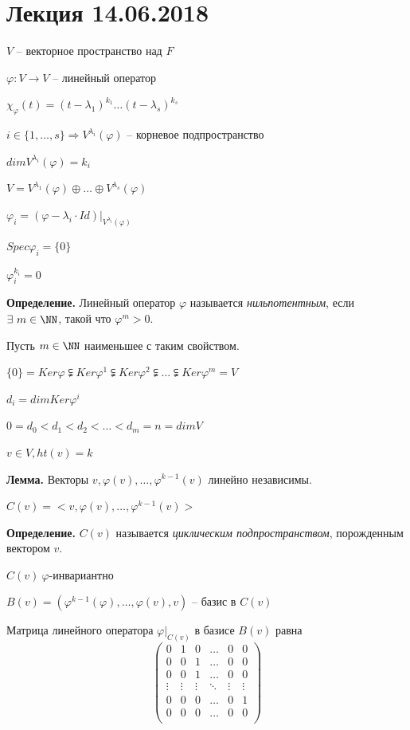 \section{Лекция 14.06.2018}

$V$ -- векторное пространство над $F$

$\varphi: V \rightarrow V$ -- линейный оператор

$\chi_{\varphi} (t) = (t - \lambda_1)^{k_1} \dots (t - \lambda_s)^{k_s}$

$i \in \{1, \dots, s\} \Rightarrow V^{\lambda_i} (\varphi)$ -- корневое подпространство

$dim V^{\lambda_i} (\varphi) = k_i$

$V = V^{\lambda_1} (\varphi) \oplus \dots \oplus V^{\lambda_s} (\varphi)$

$\varphi_i = (\varphi - \lambda_i \cdot Id) | _{V^{\lambda_i} (\varphi)}$

$Spec \varphi_i = \{0\}$

$\varphi_i^{k_i} = 0$

\bigskip
\textbf{Определение.} Линейный оператор $\varphi$ называется \textit{нильпотентным}, если $\exists \ m \in \NN$, такой что $\varphi^m > 0$.

\bigskip
Пусть $m \in \NN$ наименьшее с таким свойством.

$\{0\} = Ker \varphi \subsetneqq Ker \varphi^1 \subsetneqq Ker \varphi^2 \subsetneqq \dots \subsetneqq Ker \varphi^m = V$

$d_i = dim Ker \varphi^i$

$0 = d_0 < d_1 < d_2 < \dots < d_m = n = dim V$

$v \in V, ht(v) = k$

\bigskip
\textbf{Лемма.} Векторы $v, \varphi(v), \dots, \varphi^{k-1}(v)$ линейно независимы.

\bigskip
$C(v) = <v, \varphi(v), \dots, \varphi^{k-1} (v)>$

\bigskip
\textbf{Определение.} $C(v)$ называется \textit{циклическим подпространством}, порожденным вектором $v$.

\bigskip
$C(v) \ \varphi$-инвариантно

\bigskip
$B(v) = (\varphi^{k-1} (\varphi), \dots, \varphi(v), v)$ -- базис в $C(v)$

\bigskip
Матрица линейного оператора $\varphi|_{C(v)}$ в базисе $B(v)$ равна \begin{equation*}\begin{pmatrix} 0 & 1 & 0 & \dots & 0 & 0 \\ 0 & 0 & 1 & \dots & 0 & 0 \\ 0 & 0 & 1 & \dots & 0 & 0 \\ \vdots & \vdots & \vdots & \ddots & \vdots & \vdots \\ 0 & 0 & 0 & \dots & 0 & 1 \\ 0 & 0 & 0 & \dots & 0 & 0 \\ \end{pmatrix}\end{equation*}

